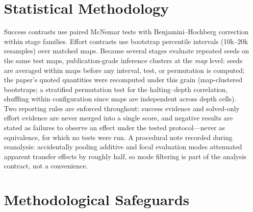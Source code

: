 \documentclass[11pt,letterpaper]{article}
\begin{document}
\section{Statistical Methodology}

Success contrasts use paired McNemar tests with Benjamini--Hochberg correction within stage families. Effort contrasts use bootstrap percentile intervals (10k--20k resamples) over matched maps. Because several stages evaluate repeated seeds on the same test maps, publication-grade inference clusters at the \emph{map} level: seeds are averaged within maps before any interval, test, or permutation is computed; the paper's quoted quantities were recomputed under this grain (map-clustered bootstraps; a stratified permutation test for the halting--depth correlation, shuffling within configuration since maps are independent across depth cells). Two reporting rules are enforced throughout: success evidence and solved-only effort evidence are never merged into a single score, and negative results are stated as failures to observe an effect under the tested protocol---never as equivalence, for which no tests were run. A procedural note recorded during reanalysis: accidentally pooling additive and focal evaluation modes attenuated apparent transfer effects by roughly half, so mode filtering is part of the analysis contract, not a convenience.

\section{Methodological Safeguards}
\end{document}
